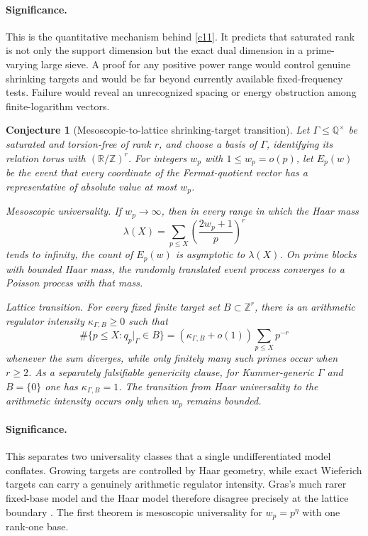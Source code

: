 \documentclass[11pt]{article}
\newtheorem{conjecture}{Conjecture}
\newcommand{\Z}{\mathbb Z}
\newcommand{\Q}{\mathbb Q}
\newcommand{\R}{\mathbb R}
\begin{document}
\paragraph{Significance.}
This is the quantitative mechanism behind \cref{c11}.  It predicts that saturated rank is
not only the support dimension but the exact dual dimension in a prime-varying large
sieve.  A proof for any positive power range would control genuine shrinking targets
and would be far beyond currently available fixed-frequency tests.  Failure would reveal
an unrecognized spacing or energy obstruction among finite-logarithm vectors.

\begin{conjecture}[Mesoscopic-to-lattice shrinking-target transition]\label{c13}
Let $\Gamma\le\Q^\times$ be saturated and torsion-free of rank $r$, and choose a
basis of $\Gamma$, identifying its relation torus with $(\R/\Z)^r$.  For integers $w_p$ with $1\le w_p=o(p)$, let $E_p(w)$ be the event
that every coordinate of the Fermat-quotient vector has a representative of absolute
value at most $w_p$.

\emph{Mesoscopic universality.}  If $w_p\to\infty$, then in every range in which the
Haar mass
\[
 \lambda(X)=\sum_{p\le X}\left(\frac{2w_p+1}{p}\right)^r
\]
tends to infinity, the count of $E_p(w)$ is asymptotic to $\lambda(X)$.  On prime
blocks with bounded Haar mass, the randomly translated event process converges to
a Poisson process with that mass.

\emph{Lattice transition.}  For every fixed finite target set
$B\subset\Z^r$, there is an arithmetic regulator intensity
$\kappa_{\Gamma,B}\ge0$ such that
\[
 \#\{p\le X:q_p|_\Gamma\in B\}
 =(\kappa_{\Gamma,B}+o(1))\sum_{p\le X}p^{-r}
\]
whenever the sum diverges, while only finitely many such primes occur when $r\ge2$.
As a separately falsifiable genericity clause, for Kummer-generic $\Gamma$ and $B=\{0\}$ one has $\kappa_{\Gamma,B}=1$.  The transition from
Haar universality to the arithmetic intensity occurs only when $w_p$ remains bounded.
\end{conjecture}

\paragraph{Significance.}
This separates two universality classes that a single undifferentiated model
conflates.  Growing targets
are controlled by Haar geometry, while exact Wieferich targets can carry a genuinely
arithmetic regulator intensity.  Gras's much rarer fixed-base model and the Haar model
therefore disagree precisely at the lattice boundary \cite{Gras,BGKK}.  The first
theorem is mesoscopic universality for $w_p=p^\eta$ with one rank-one base.
\end{document}
